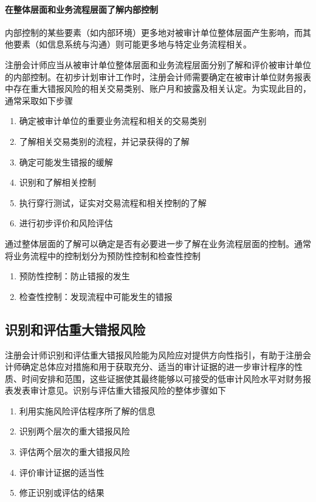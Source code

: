 \documentclass[UTF8,12pt]{ctexart}
\numberwithin{equation}{section} %
\numberwithin{figure}{section}
\numberwithin{table}{section}
\begin{document}
	\paragraph{在整体层面和业务流程层面了解内部控制}
	内部控制的某些要素（如内部环境）更多地对被审计单位整体层面产生影响，而其他要素（如信息系统与沟通）则可能更多地与特定业务流程相关。
	
	注册会计师应当从被审计单位整体层面和业务流程层面分别了解和评价被审计单位的内部控制。在初步计划审计工作时，注册会计师需要确定在被审计单位财务报表中存在重大错报风险的相关交易类别、账户月和披露及相关认定。为实现此目的，通常采取如下步骤
	\begin{enumerate}
		\item 确定被审计单位的重要业务流程和相关的交易类别
		
		\item 了解相关交易类别的流程，并记录获得的了解
		
		\item 确定可能发生错报的缓解
		
		\item 识别和了解相关控制
		
		\item 执行穿行测试，证实对交易流程和相关控制的了解
		
		\item 进行初步评价和风险评估
	\end{enumerate}
	
	通过整体层面的了解可以确定是否有必要进一步了解在业务流程层面的控制。通常将业务流程中的控制划分为预防性控制和检查性控制
	\begin{enumerate}
		\item 预防性控制：防止错报的发生
		
		\item 检查性控制：发现流程中可能发生的错报
	\end{enumerate}
	
	\subsection{识别和评估重大错报风险}
	注册会计师识别和评估重大错报风险能为风险应对提供方向性指引，有助于注册会计师确定总体应对措施和用于获取充分、适当的审计证据的进一步审计程序的性质、时间安排和范围，这些证据使其最终能够以可接受的低审计风险水平对财务报表发表审计意见。识别与评估重大错报风险的整体步骤如下
	\begin{enumerate}
		\item 利用实施风险评估程序所了解的信息
		
		\item 识别两个层次的重大错报风险
		
		\item 评估两个层次的重大错报风险
		
		\item 评价审计证据的适当性
		
		\item 修正识别或评估的结果
	\end{enumerate}
	
\end{document}
